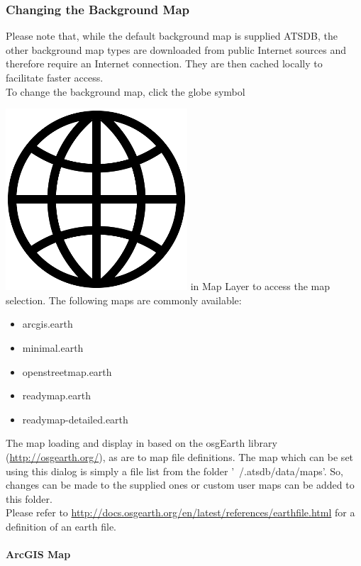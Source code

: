 \subsubsection{Changing the Background Map}

Please note that, while the default background map is supplied ATSDB, the other background map types are downloaded from public Internet sources and therefore require an Internet connection. They are then cached locally to facilitate faster access. \\

To change the background map, click the globe symbol {\includegraphics[scale=0.05]{../../data/icons/globe.png} in Map Layer to access the map selection. The following maps are commonly available:

\begin{itemize}
 \item arcgis.earth
 \item minimal.earth
 \item openstreetmap.earth
 \item readymap.earth
 \item readymap-detailed.earth
\end{itemize}

The map loading and display in based on the osgEarth library (\url{http://osgearth.org/}), as are to map file definitions. The map which can be set using this dialog is simply a file list from the folder '~/.atsdb/data/maps'. So, changes can be made to the supplied ones or custom user maps can be added to this folder. \\
Please refer to \url{http://docs.osgearth.org/en/latest/references/earthfile.html} for a definition of an earth file.

\newpage
\paragraph{ArcGIS Map}

}
